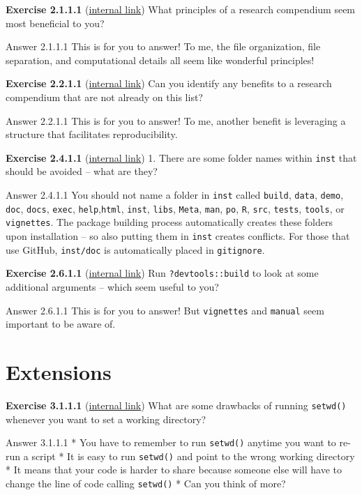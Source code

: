 \documentclass[
]{book}
\begin{document}
\textbf{Exercise 2.1.1.1} (\protect\hyperlink{ex-set7}{internal link})
What principles of a research compendium seem most beneficial to you?

Answer 2.1.1.1
This is for you to answer! To me, the file organization, file separation, and computational details all seem like wonderful principles!

\textbf{Exercise 2.2.1.1} (\protect\hyperlink{ex-set8}{internal link})
Can you identify any benefits to a research compendium that are not already on this list?

Answer 2.2.1.1
This is for you to answer! To me, another benefit is leveraging a structure that facilitates reproducibility.

\textbf{Exercise 2.4.1.1} (\protect\hyperlink{ex-set9}{internal link})
1. There are some folder names within \texttt{inst} that should be avoided -- what are they?

Answer 2.4.1.1
You should not name a folder in \texttt{inst} called \texttt{build}, \texttt{data}, \texttt{demo}, \texttt{doc}, \texttt{docs}, \texttt{exec}, \texttt{help},\texttt{html}, \texttt{inst}, \texttt{libs}, \texttt{Meta}, \texttt{man}, \texttt{po}, \texttt{R}, \texttt{src}, \texttt{tests}, \texttt{tools}, or \texttt{vignettes}. The package building process automatically creates these folders upon installation -- so also putting them in \texttt{inst} creates conflicts. For those that use GitHub, \texttt{inst/doc} is automatically placed in \texttt{gitignore}.

\textbf{Exercise 2.6.1.1} (\protect\hyperlink{ex-set10}{internal link})
Run \texttt{?devtools::build} to look at some additional arguments -- which seem useful to you?

Answer 2.6.1.1
This is for you to answer! But \texttt{vignettes} and \texttt{manual} seem important to be aware of.

\hypertarget{extensions-1}{%
\section*{Extensions}\label{extensions-1}}

\textbf{Exercise 3.1.1.1} (\protect\hyperlink{ex-set11}{internal link})
What are some drawbacks of running \texttt{setwd()} whenever you want to set a working directory?

Answer 3.1.1.1
* You have to remember to run \texttt{setwd()} anytime you want to re-run a script
* It is easy to run \texttt{setwd()} and point to the wrong working directory
* It means that your code is harder to share because someone else will have to change the line of code calling \texttt{setwd()}
* Can you think of more?
\end{document}
